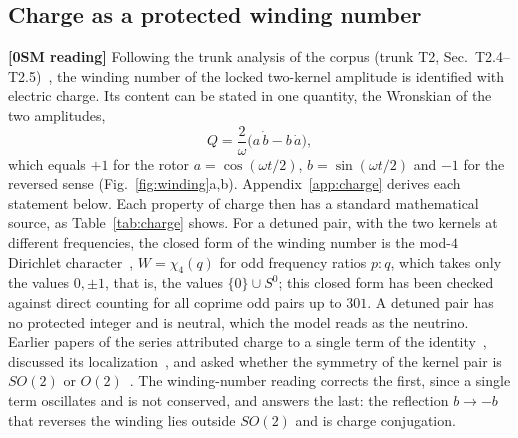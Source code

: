 \documentclass[%
 reprint, amsmath,amssymb, aps, prb, ]{revtex4-2}
\numberwithin{equation}{section}
\begin{document}
\subsection{Charge as a protected winding number}

\textbf{[0SM reading]} Following the trunk analysis of the corpus (trunk T2, Sec.~T2.4--T2.5)~\cite{ref:trunks}, the winding number of the locked two-kernel amplitude is identified with electric charge. Its content can be stated in one quantity, the Wronskian of the two amplitudes,
\begin{equation}
Q=\frac{2}{\omega}\big(a\,\dot b-b\,\dot a\big),
\label{eq:wronskian}
\end{equation}
which equals $+1$ for the rotor $a=\cos(\omega t/2)$, $b=\sin(\omega t/2)$ and $-1$ for the reversed sense (Fig.~\ref{fig:winding}a,b). Appendix~\ref{app:charge} derives each statement below. Each property of charge then has a standard mathematical source, as Table~\ref{tab:charge} shows. For a detuned pair, with the two kernels at different frequencies, the closed form of the winding number is the mod-$4$ Dirichlet character~\cite{ref:apostol}, $W=\chi_4(q)$ for odd frequency ratios $p:q$, which takes only the values $0,\pm1$, that is, the values $\{0\}\cup S^0$; this closed form has been checked against direct counting for all coprime odd pairs up to $301$. A detuned pair has no protected integer and is neutral, which the model reads as the neutrino. Earlier papers of the series attributed charge to a single term of the identity~\cite{ref:p42}, discussed its localization~\cite{ref:p44}, and asked whether the symmetry of the kernel pair is $SO(2)$ or $O(2)$~\cite{ref:p48}. The winding-number reading corrects the first, since a single term oscillates and is not conserved, and answers the last: the reflection $b\to-b$ that reverses the winding lies outside $SO(2)$ and is charge conjugation.
\end{document}
